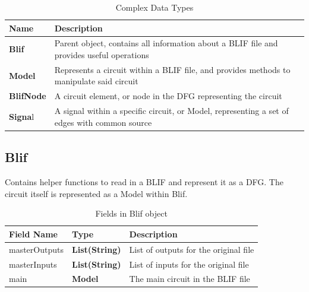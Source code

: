 \documentclass[12pt,final,oneside]{dwThesis} %
\begin{document}
   \begin{table}
      \begin{center}

      \begin{tabularx}
         {\linewidth}{lX} \toprule Name &
         Description\\
         \midrule
         \textbf{Blif} & Parent object, contains all information
         about a \gls{BLIF} file and provides useful operations \\
         \textbf{Model} &
         Represents a circuit within a \gls{BLIF} file, and provides methods to
         manipulate said circuit \\
         \textbf{BlifNode} & A circuit element, or node in
         the \gls{DFG} representing the circuit \\
         \textbf{Signa}l & A signal within a
         specific circuit, or Model, representing a set of edges with common
         source \\
         \bottomrule 
      \end{tabularx}
      \caption{Complex Data Types}\label{complexTypes}

   \end{center}\end{table}



   \subsection{Blif}
   Contains helper functions to read in a \gls{BLIF} and
   represent it as a \gls{DFG}.  The circuit itself is represented as a Model
   within Blif.  
   \begin{table}
      \begin{center}

      \begin{tabularx}
         {\linewidth}{llX} \toprule Field
         Name & Type & Description\\
         \midrule masterOutputs &
         \textbf{List(String)} & List of outputs for the original file \\

         masterInputs & \textbf{List(String)} & List of inputs for the original
         file \\
         main & \textbf{Model} & The main circuit in the \gls{BLIF}
         file\\
         \bottomrule 
      \end{tabularx}
      \caption{Fields in Blif object}

   \end{center}\end{table}
\end{document}
